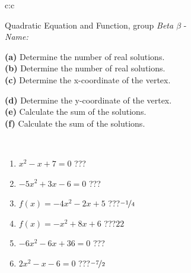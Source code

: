 \documentclass[10pt]{report}
\begin{document}
\begin{tabular}{c:c}
\begin{minipage}[c][104.5mm][t]{0.5\linewidth}
\begin{center}
\vspace{7mm}
{\huge {\LARGE Quadratic Equation and Function}, group \textit{Beta $\beta$} -}\\[5mm]
\textit{Name:}\phantom{xxxxxxxxxxxxxxxxxxxxxxxxxxxxxxxxxxxxxxxxxxxxxxxxxxxxxxxxxxxxxxxxx}\\[5mm]
\begin{minipage}{0.95\linewidth}
\begin{center}
{\small \begin{minipage}{0.5\textwidth}
\textbf{(a)} Determine the number of real solutions. \\[1mm]
\textbf{(b)} Determine the number of real solutions. \\[1mm]
\textbf{(c)} Determine the x-coordinate of the vertex.
\end{minipage} \begin{minipage}{0.49\textwidth}
\textbf{(d)} Determine the y-coordinate of the vertex. \\[1mm]
\textbf{(e)} Calculate the sum of the solutions. \\[1mm]
\textbf{(f)} Calculate the sum of the solutions.
\end{minipage}
}
\end{center}
\end{minipage}
\\[4mm]
\begin{minipage}{0.79\linewidth}
\begin{center}
\begin{varwidth}{\linewidth}
\begin{enumerate}
\Large
\item $x^2-x+7=0$\quad \dotfill\; ???\;\dotfill {}
\item $-5x^2+3x-6=0$\quad \dotfill\; ???\;\dotfill {}
\item $f(x)=-4x^2-2x+5$\quad \dotfill\; ???\;\dotfill \quad $\nicefrac{-1}{4}$
\item $f(x)=-x^2+8x+6$\quad \dotfill\; ???\;\dotfill \quad $22$
\item $-6x^2-6x+36=0$\quad \dotfill\; ???\;\dotfill {}
\item $2x^2-x-6=0$\quad \dotfill\; ???\;\dotfill \quad $\nicefrac{-7}{2}$
\end{enumerate}
\end{varwidth}
\end{center}

\end{minipage}
\end{center}
\end{minipage}
\end{tabular}
\end{document}
